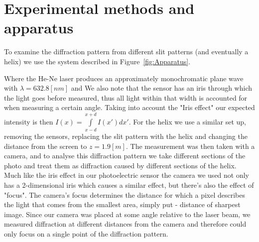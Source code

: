 \section{Experimental methods and apparatus}\label{sec:experimental-technique-and-apparatus}
To examine the diffraction pattern from different slit patterns (and eventually a helix) we use the system described in Figure~\ref{fig:Apparatus}.

Where the He-Ne laser produces an approximately monochromatic plane wave with $\lambda=632.8 [nm]$ and
We also note that the sensor has an iris through which the light goes before measured, thus all light within that width is accounted for when measuring a
certain angle.
Taking into account the "Iris effect" our expected intensity is then $I(x)=\int\limits_{x-d}^{x+d}I(x')dx'$.
For the helix we use a similar set up, removing the sensors, replacing the slit pattern with the helix and changing the distance from the screen to $z=1.9[m]$.
The measurement was then taken with a camera, and to analyse this diffraction pattern we take different sections of the photo and treat them as diffraction caused by different sections of the helix.
Much like the iris effect in our photoelectric sensor the camera we used not only has a 2-dimensional iris which causes a similar effect, but there's also the effect of "focus".
The camera's focus determines the distance for which a pixel describes the light that comes from the smallest area, simply put - distance of sharpest image.
Since our camera was placed at some angle relative to the laser beam, we measured diffraction at different distances from the camera and therefore could only focus on a single point of the diffraction pattern.

